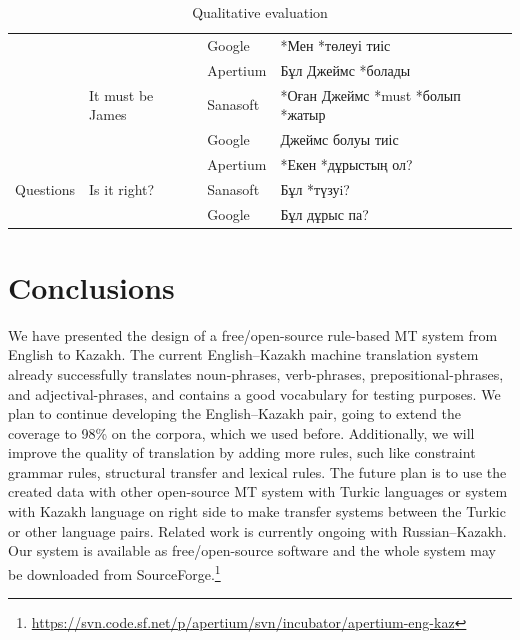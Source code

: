 \documentclass[11pt]{article}
\begin{document}
\begin{table}
\begin{tabular}{|l|l|l|l|}
                                  &                                         & Google   & *Мен *төлеуі тиіс \\ %
                                  & \multirow{3}{*}{It must be James}       & Apertium & Бұл Джеймс *болады \\ %
                                  &                                         & Sanasoft & *Оған Джеймс *must *болып *жатыр  \\ %
                                  &                                         & Google   & Джеймс болуы тиіс \\ %
    \hline 
    \multirow{3}{*}{Questions}    & \multirow{3}{*}{Is it right?}           & Apertium & *Екен *дұрыстың ол? \\ %
                                  &                                         & Sanasoft & Бұл *түзуi? \\ %
                                  &                                         & Google   & Бұл дұрыс па? \\
    \hline 
  \end{tabular}

  \caption{Qualitative evaluation}
  \label{table:qualeval}
\end{table}

\section{Conclusions}

We have presented the design of a free/open-source rule-based MT system from English to Kazakh. The current English--Kazakh machine translation 
system already successfully translates noun-phrases, verb-phrases, prepositional-phrases, and adjectival-phrases, and 
contains a good vocabulary for testing purposes. 
We plan to continue developing the English--Kazakh pair, going to extend the coverage to 98\% on the corpora, 
which we used before. Additionally, we will improve the quality of translation by adding more rules, such like 
constraint grammar rules, structural transfer and lexical rules. The future plan is to use the created data with other 
open-source MT system with Turkic languages or system with Kazakh language on right side to make transfer systems 
between the Turkic or other language pairs. Related work is currently ongoing with Russian--Kazakh.
Our system is available as free/open-source software and the whole system may be downloaded 
from SourceForge.\footnote{\url{https://svn.code.sf.net/p/apertium/svn/incubator/apertium-eng-kaz}}
\end{document}
